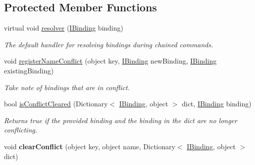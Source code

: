\subsection*{Protected Member Functions}
\begin{DoxyCompactItemize}
\item 
\hypertarget{classstrange_1_1framework_1_1impl_1_1_binder_a8f463a4edc3e3bbdaac51a8aaa5d240f}{virtual void \hyperlink{classstrange_1_1framework_1_1impl_1_1_binder_a8f463a4edc3e3bbdaac51a8aaa5d240f}{resolver} (\hyperlink{interfacestrange_1_1framework_1_1api_1_1_i_binding}{I\-Binding} binding)}\label{classstrange_1_1framework_1_1impl_1_1_binder_a8f463a4edc3e3bbdaac51a8aaa5d240f}

\begin{DoxyCompactList}\small\item\em The default handler for resolving bindings during chained commands. \end{DoxyCompactList}\item 
void \hyperlink{classstrange_1_1framework_1_1impl_1_1_binder_a6150d8762ded854628d21c5e35489adc}{register\-Name\-Conflict} (object key, \hyperlink{interfacestrange_1_1framework_1_1api_1_1_i_binding}{I\-Binding} new\-Binding, \hyperlink{interfacestrange_1_1framework_1_1api_1_1_i_binding}{I\-Binding} existing\-Binding)
\begin{DoxyCompactList}\small\item\em Take note of bindings that are in conflict. \end{DoxyCompactList}\item 
\hypertarget{classstrange_1_1framework_1_1impl_1_1_binder_a541607fe739b65b5f28b4152bec49a46}{bool \hyperlink{classstrange_1_1framework_1_1impl_1_1_binder_a541607fe739b65b5f28b4152bec49a46}{is\-Conflict\-Cleared} (Dictionary$<$ \hyperlink{interfacestrange_1_1framework_1_1api_1_1_i_binding}{I\-Binding}, object $>$ dict, \hyperlink{interfacestrange_1_1framework_1_1api_1_1_i_binding}{I\-Binding} binding)}\label{classstrange_1_1framework_1_1impl_1_1_binder_a541607fe739b65b5f28b4152bec49a46}

\begin{DoxyCompactList}\small\item\em Returns true if the provided binding and the binding in the dict are no longer conflicting. \end{DoxyCompactList}\item 
\hypertarget{classstrange_1_1framework_1_1impl_1_1_binder_a1a426d227eeaa00823a744472c219698}{void {\bfseries clear\-Conflict} (object key, object name, Dictionary$<$ \hyperlink{interfacestrange_1_1framework_1_1api_1_1_i_binding}{I\-Binding}, object $>$ dict)}\label{classstrange_1_1framework_1_1impl_1_1_binder_a1a426d227eeaa00823a744472c219698}


\end{DoxyCompactItemize}
